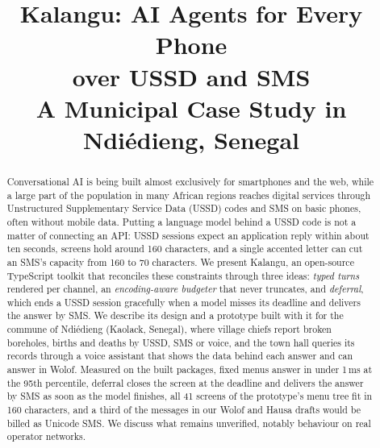 \documentclass[conference]{IEEEtran}
\begin{document}
\title{Kalangu: AI Agents for Every Phone\\over USSD and SMS\\[4pt]
{\Large A Municipal Case Study in Ndi\'edieng, Senegal}}

\author{
\and
{}
}

\maketitle

\begin{abstract}
Conversational AI is being built almost exclusively for smartphones and the
web, while a large part of the population in many African regions reaches
digital services through Unstructured Supplementary Service Data (USSD) codes
and SMS on basic phones, often without mobile data. Putting a language model
behind a USSD code is not a matter of connecting an API: USSD sessions expect
an application reply within about ten seconds, screens hold around 160
characters, and a single accented letter can cut an SMS's capacity from 160
to 70 characters. We present Kalangu, an open-source TypeScript toolkit that
reconciles these constraints through three ideas: \emph{typed turns} rendered
per channel, an \emph{encoding-aware budgeter} that never truncates, and
\emph{deferral}, which ends a USSD session gracefully when a model misses its
deadline and delivers the answer by SMS. We describe its design and a
prototype built with it for the commune of Ndi\'edieng (Kaolack, Senegal),
where village chiefs report broken boreholes, births and deaths by USSD, SMS
or voice, and the town hall queries its records through a voice assistant
that shows the data behind each answer and can answer in Wolof. Measured on
the built packages, fixed menus answer in under 1\,ms at the 95th percentile,
deferral closes the screen at the deadline and delivers the answer by SMS as
soon as the model finishes, all 41 screens of the prototype's menu tree fit in
160 characters, and a third of the messages in our Wolof and Hausa drafts
would be billed as Unicode SMS. We discuss what remains unverified, notably
behaviour on real operator networks.
\end{abstract}
\end{document}
